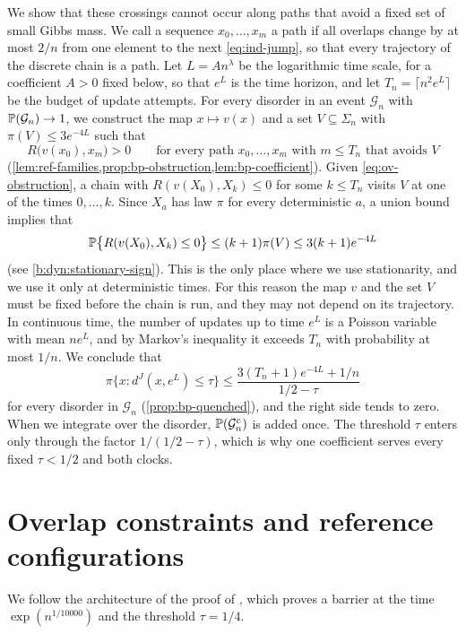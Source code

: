 We show that these crossings cannot occur along paths that avoid a fixed set
of small Gibbs mass. We call a sequence $x_0,\dots,x_m$ a path if all overlaps
change by at most $2/n$ from one element to the next \eqref{eq:ind-jump}, so
that every trajectory of the discrete chain is a path. Let $L=An^\lambda$ be
the logarithmic time scale, for a coefficient $A>0$ fixed below, so that $e^L$
is the time horizon, and let $T_n=\lceil n^2e^L\rceil$ be the budget of update
attempts. For every
disorder in an event $\mathcal G_n$ with $\mathbb P(\mathcal G_n)\to1$, we construct
the map $x\mapsto v(x)$ and a set $V\subseteq\Sigma_n$ with
$\pi(V)\le3e^{-4L}$ such that
\begin{equation}\label{eq:ov-obstruction}
 R\bigl(v(x_0),x_m\bigr)>0\qquad\text{for every path }x_0,\dots,x_m
 \text{ with }m\le T_n\text{ that avoids }V
\end{equation}
(\cref{lem:ref-families,prop:bp-obstruction,lem:bp-coefficient}). Given
\eqref{eq:ov-obstruction}, a chain with $R(v(X_0),X_k)\le0$ for some
$k\le T_n$ visits $V$ at one of the times $0,\dots,k$. Since $X_a$ has law
$\pi$ for every deterministic $a$, a union bound implies that
\[
 \mathbb P\bigl\{R(v(X_0),X_k)\le0\bigr\}\le(k+1)\pi(V)\le3(k+1)e^{-4L}
\]
(see \eqref{b:dyn:stationary-sign}). This is the only place where we use
stationarity, and we use it only at deterministic times. For this reason the
map $v$ and the set $V$ must be fixed before the chain is run, and they may not
depend on its trajectory. In continuous time, the number of updates up to time
$e^L$ is a Poisson variable with mean $ne^L$, and by Markov's inequality it
exceeds $T_n$ with probability at most $1/n$. We conclude that
\[
 \pi\bigl\{x:d^J(x,e^L)\le\tau\bigr\}\le\frac{3(T_n+1)e^{-4L}+1/n}{1/2-\tau}
\]
for every disorder in $\mathcal G_n$ (\cref{prop:bp-quenched}), and the right
side tends to zero. When we integrate over the disorder, $\mathbb P(\mathcal G_n^c)$
is added once. The threshold $\tau$ enters only through the factor
$1/(1/2-\tau)$, which is why one coefficient serves every fixed $\tau<1/2$ and
both clocks.

\section{Overlap constraints and reference configurations}\label{sec:ov-architecture}

We follow the architecture of the proof of \cite[Theorem~1.1]{oai-barriers},
which proves a barrier at the time $\exp(n^{1/10000})$ and the threshold
$\tau=1/4$.

